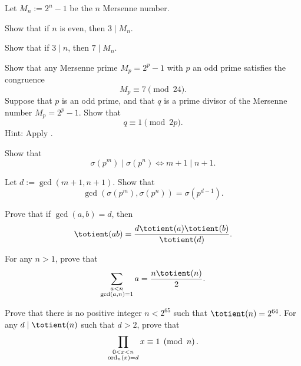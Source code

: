 \begin{routine}
  \exercise Let $M_n:=2^n-1$ be the $n$\supth{} Mersenne number.
  \begin{subexenum}
  \item Show that if $n$ is even, then $3\mid M_n$.
  \item Show that if $3\mid n$, then $7\mid M_n$.
  \end{subexenum}
  \exercise Show that any Mersenne prime $M_p=2^p-1$ with $p$ an odd prime satisfies the congruence
  \begin{equation*}
    M_p\equiv 7\pmod{24}.
  \end{equation*}
  \exercise Suppose that $p$ is an odd prime, and that $q$ is a prime divisor of the Mersenne number $M_p=2^p-1$. Show that
  \begin{equation*}
    q\equiv 1\pmod{2p}.
  \end{equation*}
  Hint: Apply .
  \exercise
  \begin{subexenum}
  \item Show that
    \begin{equation*}
      \sigma(p^m)\mid \sigma(p^n) \Leftrightarrow m+1\mid n+1.
    \end{equation*}
  \item Let $d:=\gcd(m+1,n+1)$. Show that
    \begin{equation*}
      \gcd(\sigma(p^m),\sigma(p^n))=\sigma(p^{d-1}).
    \end{equation*}
  \end{subexenum}
  \exercise
  \begin{subexenum}
  \item Prove that if $\gcd(a,b)=d$, then
  \begin{equation*}
    \totient(ab)=\frac{d\totient(a)\totient(b)}{\totient(d)}.
  \end{equation*}
  \item For any $n>1$, prove that
  \begin{equation*}
    \sum_{\substack{a<n\\\gcd(a,n)=1}}a = \frac{n\totient(n)}{2}.
  \end{equation*}
  \end{subexenum}
  \exercise Prove that there is no positive integer $n<2^{65}$ such that $\totient(n)=2^{64}$.
  \exercise For any $d\mid \totient(n)$ such that $d>2$, prove that
  \begin{equation*}
    \prod_{\substack{0<x<n \\\ord_n(x)=d}}x\equiv 1\pmod n.

\end{equation*}
\end{routine}
